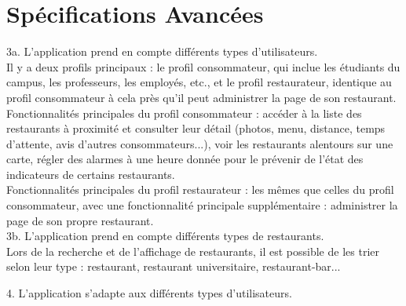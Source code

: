 \section{Spécifications Avancées}

3a. L'application prend en compte différents types d'utilisateurs. \\
Il y a deux profils principaux : le profil consommateur, qui inclue les étudiants du campus, les professeurs, les employés, etc., et le profil restaurateur, identique au profil consommateur à cela près qu'il peut administrer la page de son restaurant. \\
Fonctionnalités principales du profil consommateur : accéder à la liste des restaurants à proximité et consulter leur détail (photos, menu, distance, temps d'attente, avis d'autres consommateurs...), voir les restaurants alentours sur une carte, régler des alarmes à une heure donnée pour le prévenir de l'état des indicateurs de certains restaurants. \\
Fonctionnalités principales du profil restaurateur : les mêmes que celles du profil consommateur, avec une fonctionnalité principale supplémentaire : administrer la page de son propre restaurant.\\

3b. L'application prend en compte différents types de restaurants.\\
Lors de la recherche et de l'affichage de restaurants, il est possible de les trier selon leur type : restaurant, restaurant universitaire, restaurant-bar...

4. L'application s'adapte aux différents types d'utilisateurs.\\

